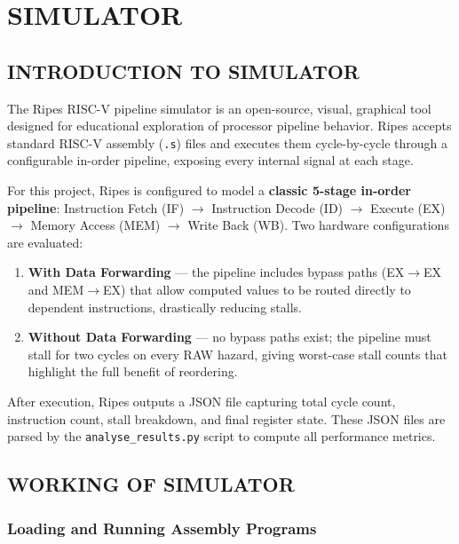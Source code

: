 \documentclass[11pt]{report}
\begin{document}
\chapter{SIMULATOR}

\section{INTRODUCTION TO SIMULATOR}

The Ripes RISC-V pipeline simulator is an open-source, visual, graphical tool designed for educational exploration of processor pipeline behavior. Ripes accepts standard RISC-V assembly (\texttt{.s}) files and executes them cycle-by-cycle through a configurable in-order pipeline, exposing every internal signal at each stage.

For this project, Ripes is configured to model a \textbf{classic 5-stage in-order pipeline}: Instruction Fetch (IF) $\rightarrow$ Instruction Decode (ID) $\rightarrow$ Execute (EX) $\rightarrow$ Memory Access (MEM) $\rightarrow$ Write Back (WB). Two hardware configurations are evaluated:

\begin{enumerate}
    \item \textbf{With Data Forwarding} --- the pipeline includes bypass paths (EX$\rightarrow$EX and MEM$\rightarrow$EX) that allow computed values to be routed directly to dependent instructions, drastically reducing stalls.
    \item \textbf{Without Data Forwarding} --- no bypass paths exist; the pipeline must stall for two cycles on every RAW hazard, giving worst-case stall counts that highlight the full benefit of reordering.
\end{enumerate}

After execution, Ripes outputs a JSON file capturing total cycle count, instruction count, stall breakdown, and final register state. These JSON files are parsed by the \texttt{analyse\_results.py} script to compute all performance metrics.

\section{WORKING OF SIMULATOR}

\subsection{Loading and Running Assembly Programs}
\end{document}
